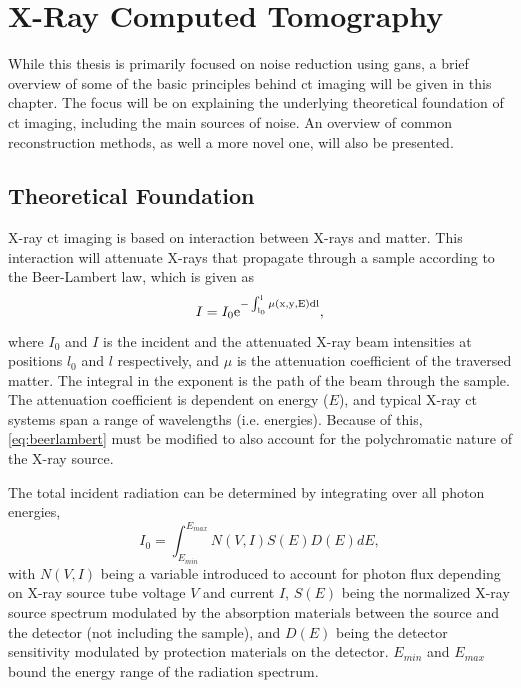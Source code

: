 \chapter{X-Ray Computed Tomography}
\label{sec:ct}
While this thesis is primarily focused on noise reduction using \acrshort{gan}s, a brief overview of some of the basic principles behind \acrfull{ct} imaging will be given in this chapter. The focus will be on explaining the underlying theoretical foundation of \acrshort{ct} imaging, including the main sources of noise. An overview of common reconstruction methods, as well a more novel one, will also be presented.

\section{Theoretical Foundation}
\label{sec:ct:theoreticalfoundation}
X-ray \acrshort{ct} imaging is based on interaction between X-rays and matter. This interaction will attenuate X-rays that propagate through a sample according to the Beer-Lambert law, which is given as \cite{doi:10.1063/1.4950807}
\begin{equation}
    \label{eq:beerlambert}
    I = I_0 \rm{e}^{-\int_{l_0}^{l}\mu\left(x,y,E\right)dl},
\end{equation}
where $I_0$ and $I$ is the incident and the attenuated X-ray beam intensities at positions $l_0$ and $l$ respectively, and $\mu$ is the attenuation coefficient of the traversed matter. The integral in the exponent is the path of the beam through the sample. The attenuation coefficient is dependent on energy ($E$), and typical X-ray \acrshort{ct} systems span a range of wavelengths (i.e. energies). 
Because of this, \cref{eq:beerlambert} must be modified to also account for the polychromatic nature of the X-ray source. 

The total incident radiation can be determined by integrating over all photon energies, 
\begin{equation}
    \label{eq:incidentradiation}
    I_0 = \int_{E_{min}}^{E_{max}}N\left(V,I\right)S\left(E\right)D\left(E\right)dE,
\end{equation}
with $N\left(V,I\right)$ being a variable introduced to account for photon flux depending on X-ray source tube voltage $V$ and current $I$, $S\left(E\right)$ being the normalized X-ray source spectrum modulated by the absorption materials between the source and the detector (not including the sample), and $D\left(E\right)$ being the detector sensitivity modulated by protection materials on the detector. $E_{min}$ and $E_{max}$ bound the energy range of the radiation spectrum. 

